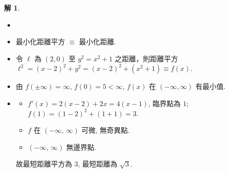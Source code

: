 \documentclass[12pt]{extarticle}
\newcommand{\ds}{\displaystyle}
\newcommand{\ie}{\;\Longrightarrow\;}
\theoremstyle{definition}
\newtheorem*{ex}{例}
\newtheorem*{sol}{解}
\begin{document}
\begin{sol}
  \begin{itemize}\setlength\itemsep{0em}
    \item[]
    \item 最小化距離平方 $\equiv$ 最小化距離. 
    \item 令 $\ell$ 為 $(2, 0)$ 至 $y^2 = x^2 + 1$ 之距離，則距離平方 $\ds\ell^2 = (x - 2)^2 + y^2 = (x - 2)^2 + (x^2 + 1)\equiv f(x)$. 
    \item 由 $\ds f(\pm\infty) = \infty$, $\ds f(0) = 5 < \infty$, $f(x)$ 在 $(-\infty, \infty)$ 有最小值. 
    \item 
      \begin{itemize}\setlength\itemsep{0em}
        \item $\ds f'(x) = 2(x - 2) + 2x = 4(x - 1)$, 臨界點為 $1$; $f(1) = (1 - 2)^2 + (1 + 1) = 3.$ 
        \item $f$ 在 $(-\infty,\,\infty)$ 可微, 無奇異點. 
        \item $(-\infty,\,\infty)$ 無邊界點. 
      \end{itemize}
      故最短距離平方為 $3$, 最短距離為 $\sqrt{3}$. 
    \end{itemize}
\end{sol}

%
\end{document}
